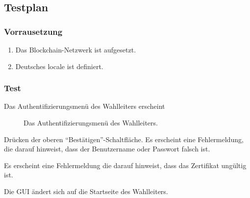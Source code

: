 \documentclass[parskip=full]{scrartcl}
\begin{document}
\subsection{Testplan}
\subsubsection{Vorrausetzung}
\begin{enumerate}
		\item Das Blockchain-Netzwerk ist aufgesetzt.
		\item Deutsches locale ist definiert.
\end{enumerate}

\subsubsection{Test}
		{Das Authentifizierungsmenü des Wahlleiters erscheint}

\begin{figure}[h!]
	\caption{\label{fig:sup_authentication}
		Das Authentifizierungsmenü des Wahlleiters.
	}
\end{figure}

\teststep{}
		{Drücken der oberen \enquote{Bestätigen}-Schaltfläche.}
		{Es erscheint eine Fehlermeldung, die darauf hinweist, dass der Benutzername oder Passwort falsch ist.}

		{Es erscheint eine Fehlermeldung die darauf hinweist, dass das Zertifikat ungültig ist.}

		{Die GUI ändert sich auf die Startseite des Wahlleiters.}
\end{document}
